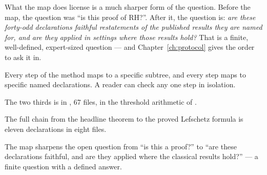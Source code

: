 What the map does license is a much sharper form of the question. Before the
map, the question was ``is this proof of RH?''. After it, the question is:
\emph{are these forty-odd declarations faithful restatements of the published
results they are named for, and are they applied in settings where those
results hold?} That is a finite, well-defined, expert-sized question --- and
Chapter~\ref{ch:protocol} gives the order to ask it in.

\begin{keytakeaways}
\item Every step of the method maps to a specific subtree, and every step maps
to specific named declarations. A reader can check any one step in isolation.
\item The two thirds is in , 67 files, in the
threshold arithmetic of .
\item The full chain from the headline theorem to the proved Lefschetz formula
is eleven declarations in eight files.
\item The map sharpens the open question from ``is this a proof?'' to ``are
these declarations faithful, and are they applied where the classical results
hold?'' --- a finite question with a defined answer.
\end{keytakeaways}

